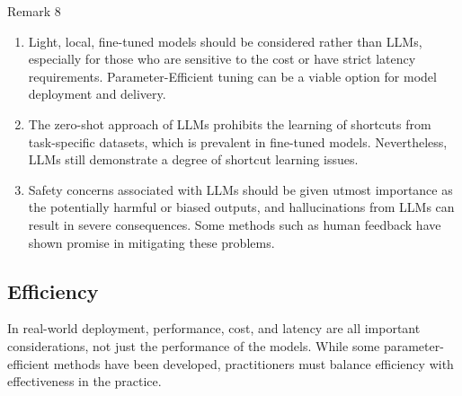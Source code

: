 \documentclass[manuscript,screen, nonacm]{acmart}
\begin{document}
\begin{applebox}{Remark 8}
\begin{enumerate}[leftmargin=0.4cm]
    \item Light, local, fine-tuned models should be considered rather than LLMs, especially for those who are sensitive to the cost or have strict latency requirements. Parameter-Efficient tuning can be a viable option for model deployment and delivery.
    \item  The zero-shot approach of LLMs prohibits the learning of shortcuts from task-specific datasets, which is prevalent in fine-tuned models. Nevertheless, LLMs still demonstrate a degree of shortcut learning issues.
    \item  Safety concerns associated with LLMs should be given utmost importance as the potentially harmful or biased outputs, and hallucinations from LLMs can result in severe consequences. Some methods such as human feedback have shown promise in mitigating these problems.
\end{enumerate}
\end{applebox}


\subsection{Efficiency}
In real-world deployment, performance, cost, and latency are all important considerations, not just the performance of the models. While some parameter-efficient methods have been developed, practitioners must balance efficiency with effectiveness in the practice. 
\end{document}
